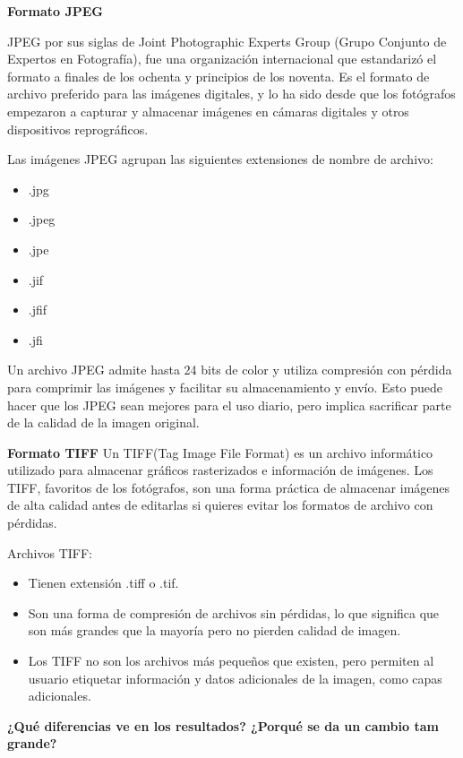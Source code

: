 \documentclass[conference,onecolumn,12pt]{IEEEtran}
\numberwithin{equation}{subsection}
\begin{document}
\textbf{Formato JPEG}

JPEG por sus siglas de Joint Photographic Experts Group (Grupo Conjunto de Expertos en Fotografía), fue una organización internacional que estandarizó el formato a finales de los ochenta y principios de los noventa. Es el formato de archivo preferido para las imágenes digitales, y lo ha sido desde que los fotógrafos empezaron a capturar y almacenar imágenes en cámaras digitales y otros dispositivos reprográficos\cite{balanis}.

Las imágenes JPEG agrupan las siguientes extensiones de nombre de archivo:

\begin{itemize}
\item .jpg
\item .jpeg
\item .jpe
\item .jif
\item .jfif
\item .jfi
\end{itemize}


Un archivo JPEG admite hasta 24 bits de color y utiliza compresión con pérdida para comprimir las imágenes y facilitar su almacenamiento y envío. Esto puede hacer que los JPEG sean mejores para el uso diario, pero implica sacrificar parte de la calidad de la imagen original.


\textbf{Formato TIFF}
Un TIFF(Tag Image File Format) es un archivo informático utilizado para almacenar gráficos rasterizados e información de imágenes. Los TIFF, favoritos de los fotógrafos, son una forma práctica de almacenar imágenes de alta calidad antes de editarlas si quieres evitar los formatos de archivo con pérdidas.

Archivos TIFF:
\begin{itemize}
\item Tienen extensión .tiff o .tif.
\item Son una forma de compresión de archivos sin pérdidas, lo que significa que son más grandes que la mayoría pero no pierden calidad de imagen.
\item Los TIFF no son los archivos más pequeños que existen, pero permiten al usuario etiquetar información y datos adicionales de la imagen, como capas adicionales.
\end{itemize}




\textbf{¿Qué diferencias ve en los resultados? ¿Porqué se da un cambio tam grande?}
\end{document}
